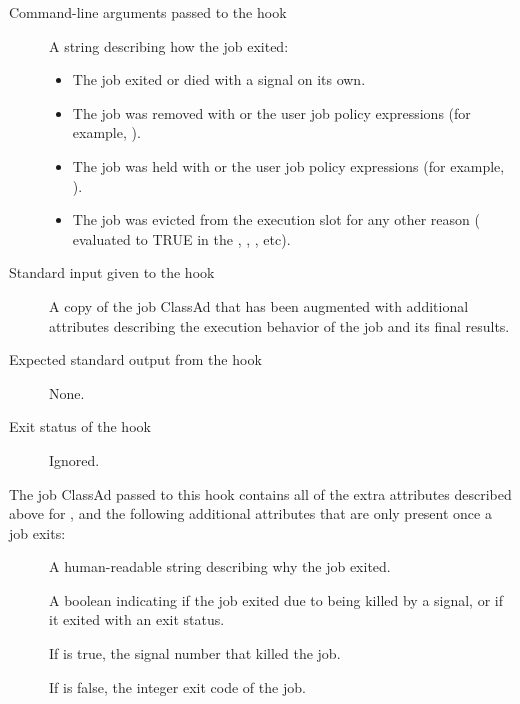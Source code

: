\begin{itemize}
\begin{description}
\item[Command-line arguments passed to the hook]
  A string describing how the job exited:
  \begin{itemize}
    \item \verb@exit@ The job exited or died with a signal on its own.
    \item \verb@remove@ The job was removed with  or the
    user job policy expressions (for example, ).
    \item \verb@hold@ The job was held with  or the
    user job policy expressions (for example, ).
    \item \verb@evict@ The job was evicted from the execution slot for
    any other reason ( evaluated to TRUE in the
    , , , etc).
  \end{itemize}

\item[Standard input given to the hook]
  A copy of the job ClassAd that has been augmented with additional
  attributes describing the execution behavior of the job and its
  final results.

\item[Expected standard output from the hook]
  None.

\item[Exit status of the hook]
  Ignored.
\end{description}

The job ClassAd passed to this hook contains all of the extra
attributes described above for , and
the following additional attributes that are only present once a job
exits:
\begin{description}
\item[]
  A human-readable string describing why the job exited.

\item[]
  A boolean indicating if the job exited due to being killed by a
  signal, or if it exited with an exit status.

\item[]
  If  is true, the signal number that killed the job.

\item[]
  If  is false, the integer exit code of the job.


\end{description}
\end{itemize}
